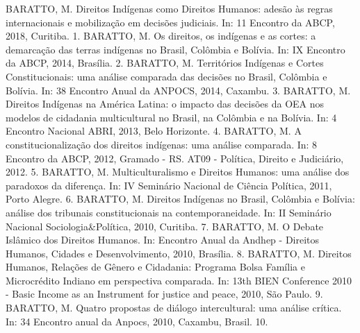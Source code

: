 \begin{cvhonors}
  \cvhonor
    {BARATTO, M.}
    {Direitos Indígenas como Direitos Humanos: adesão às regras internacionais e mobilização em decisões judiciais. In: 11 Encontro da ABCP, 2018, Curitiba.}
    {}
    {1. }
  \cvhonor
    {BARATTO, M.}
    {Os direitos, os indígenas e as cortes: a demarcação das terras indígenas no Brasil, Colômbia e Bolívia. In: IX Encontro da ABCP, 2014, Brasília.}
    {}
    {2. }
  \cvhonor
    {BARATTO, M.}
    {Territórios Indígenas e Cortes Constitucionais: uma análise comparada das decisões no Brasil, Colômbia e Bolívia. In: 38 Encontro Anual da ANPOCS, 2014, Caxambu.}
    {}
    {3. }
  \cvhonor
    {BARATTO, M.}
    {Direitos Indígenas na América Latina: o impacto das decisões da OEA nos modelos de cidadania multicultural no Brasil, na Colômbia e na Bolívia. In: 4 Encontro Nacional ABRI, 2013, Belo Horizonte.}
    {}
    {4. }
  \cvhonor
    {BARATTO, M.}
    {A constitucionalização dos direitos indígenas: uma análise comparada. In: 8 Encontro da ABCP, 2012, Gramado - RS. AT09 - Política, Direito e Judiciário, 2012.}
    {}
    {5. }
  \cvhonor
    {BARATTO, M.}
    {Multiculturalismo e Direitos Humanos: uma análise dos paradoxos da diferença. In: IV Seminário Nacional de Ciência Política, 2011, Porto Alegre.}
    {}
    {6. }
  \cvhonor
    {BARATTO, M.}
    {Direitos Indígenas no Brasil, Colômbia e Bolívia: análise dos tribunais constitucionais na contemporaneidade. In: II Seminário Nacional Sociologia\&Política, 2010, Curitiba.}
    {}
    {7. }
  \cvhonor
    {BARATTO, M.}
    {O Debate Islâmico dos Direitos Humanos. In: Encontro Anual da Andhep - Direitos Humanos, Cidades e Desenvolvimento, 2010, Brasília.}
    {}
    {8. }
  \cvhonor
    {BARATTO, M.}
    {Direitos Humanos, Relações de Gênero e Cidadania: Programa Bolsa Família e Microcrédito Indiano em perspectiva comparada. In: 13th BIEN Conference 2010 - Basic Income as an Instrument for justice and peace, 2010, São Paulo.}
    {}
    {9. }
  \cvhonor
    {BARATTO, M.}
    {Quatro propostas de diálogo intercultural: uma análise crítica. In: 34 Encontro anual da Anpocs, 2010, Caxambu, Brasil.}
    {}
    {10. }
  \end{cvhonors}
